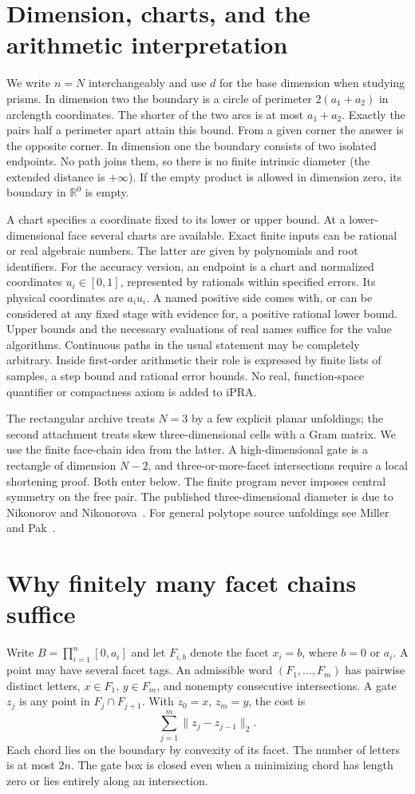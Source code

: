 \documentclass[10pt,letterpaper]{article}
\newcommand{\R}{\mathbb R}
\begin{document}
\section{Dimension, charts, and the arithmetic interpretation}
We write $n=N$ interchangeably and use $d$ for the base dimension when studying prisms. In dimension two the boundary is a circle of perimeter $2(a_1+a_2)$ in arclength coordinates. The shorter of the two arcs is at most $a_1+a_2$. Exactly the pairs half a perimeter apart attain this bound. From a given corner the answer is the opposite corner. In dimension one the boundary consists of two isolated endpoints. No path joins them, so there is no finite intrinsic diameter (the extended distance is $+\infty$). If the empty product is allowed in dimension zero, its boundary in $\R^0$ is empty.
\par A chart specifies a coordinate fixed to its lower or upper bound. At a lower-dimensional face several charts are available. Exact finite inputs can be rational or real algebraic numbers. The latter are given by polynomials and root identifiers. For the accuracy version, an endpoint is a chart and normalized coordinates $u_i\in[0,1]$, represented by rationals within specified errors. Its physical coordinates are $a_i u_i$. A named positive side comes with, or can be considered at any fixed stage with evidence for, a positive rational lower bound. Upper bounds and the necessary evaluations of real names suffice for the value algorithms. Continuous paths in the usual statement may be completely arbitrary. Inside first-order arithmetic their role is expressed by finite lists of samples, a step bound and rational error bounds. No real, function-space quantifier or compactness axiom is added to iPRA.
\par The rectangular archive treats $N=3$ by a few explicit planar unfoldings; the second attachment treats skew three-dimensional cells with a Gram matrix. We use the finite face-chain idea from the latter. A high-dimensional gate is a rectangle of dimension $N-2$, and three-or-more-facet intersections require a local shortening proof. Both enter below. The finite program never imposes central symmetry on the free pair. The published three-dimensional diameter is due to Nikonorov and Nikonorova~\cite{nik}. For general polytope source unfoldings see Miller and Pak~\cite{mp}.


\section{Why finitely many facet chains suffice}
\label{sec:chain}
Write $B=\prod_{i=1}^n[0,a_i]$ and let $F_{i,b}$ denote the facet
$x_i=b$, where $b=0$ or $a_i$. A point may have several facet tags.
An admissible word $(F_1,\ldots,F_m)$ has pairwise distinct letters,
$x\in F_1$, $y\in F_m$, and nonempty consecutive intersections.
A gate $z_j$ is any point in $F_j\cap F_{j+1}$. With
$z_0=x$, $z_m=y$, the cost is
\[
                  \sum_{j=1}^{m}\|z_j-z_{j-1}\|_2.
\]
Each chord lies on the boundary by convexity of its facet. The number
of letters is at most $2n$. The gate box is closed even when a minimizing
chord has length zero or lies entirely along an intersection.
\end{document}
